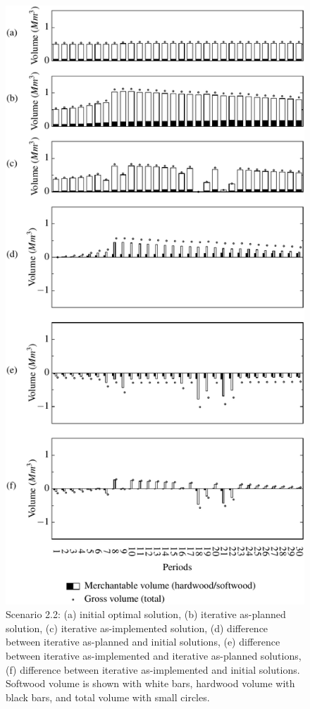 \begin{figure}[ht!]
  \caption{Scenario 2.2: (a) initial optimal solution, (b) iterative
    as-planned solution, (c) iterative as-implemented solution, (d)
    difference between iterative as-planned and initial solutions, (e)
    difference between iterative as-implemented and iterative
    as-planned solutions, (f) difference between iterative
    as-implemented and initial solutions. Softwood volume is shown
    with white bars, hardwood volume with black bars, and total volume
    with small circles.}
  \label{fig:scenario2.2}
  \medskip
  \centering
  \includegraphics[width=0.60\columnwidth]{images/s2-3b}
\end{figure}

